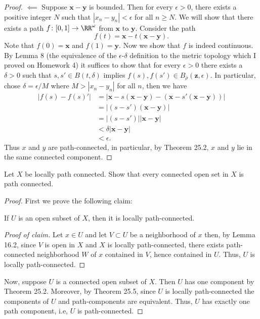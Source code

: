 \begin{proof}
$\impliedby$ Suppose $\mathbf{x}-\mathbf{y}$ is bounded. Then for
every $\epsilon>0$, there exists a positive integer $N$ such that
$|x_n-y_n|<\epsilon$ for all $n\geq N$. We will show that there
exists a path $f\colon [0,1]\to\RR^\omega$ from $\mathbf{x}$ to
$\mathbf{y}$. Consider the path
\[
f(t)=\mathbf{x}-t(\mathbf{x}-\mathbf{y}).
\]
Note that $f(0)=\mathbf{x}$ and $f(1)=\mathbf{y}$. Now we show
that $f$ is indeed continuous. By Lemma 8 (the equivalence of the
$\epsilon$-$\delta$ definition to the metric topology which I
proved on Homework 4) it suffices to show that for every
$\epsilon>0$ there exists a $\delta>0$ such that $s,s'\in B(t,\delta)$
implies $f(s),f(s')\in B_{\bar\rho}(\mathbf{z},\epsilon)$. In
particular, chose $\delta=\epsilon/M$ where $M>|x_n-y_n|$ for all
$n$, then we have
\begin{align*}
\left|f(s)-f(s)'\right|
&=\left|\mathbf{x}-s(\mathbf{x}-\mathbf{y})-
(\mathbf{x}-s'(\mathbf{x}-\mathbf{y}))\right|\\
&=\left|(s-s')(\mathbf{x}-\mathbf{y})\right|\\
&=\left|(s-s')\right|\left|\mathbf{x}-\mathbf{y}\right|\\
&<\delta\left|\mathbf{x}-\mathbf{y}\right|\\
&<\epsilon.
\end{align*}
Thus $x$ and $y$ are path-connected, in particular, by Theorem
25.2, $x$ and $y$ lie in the same connected component.
\end{proof}
\newpage
\begin{problem}[Munkres \S25, Ex.\,4]
Let $X$ be locally path connected. Show that every connected open
set in $X$ is path connected.
\end{problem}
\begin{proof}
First we prove the following claim:
\begin{claim*}
If $U$ is an open subset of $X$, then it is locally
path-connected.
\end{claim*}
\begin{proof}[Proof of claim]
\renewcommand\qedsymbol{$\spadesuit$}
Let $x\in U$ and let $V\subset U$ be a neighborhood of $x$ then,
by Lemma 16.2, since $V$ is open in $X$ and $X$ is locally
path-connected, there exists path-connected neighborhood $W$ of
$x$ contained in $V$, hence contained in $U$. Thus, $U$ is
locally path-connected.
\end{proof}
Now, suppose $U$ is a connected open subset of $X$. Then $U$ has
one component by Theorem 25.2. Moreover, by Theorem 25.5, since $U$ is locally
path-connected the components of $U$ and path-components are
equivalent. Thus, $U$ has exactly one path component, i.e, $U$ is
path-connected.
\end{proof}
